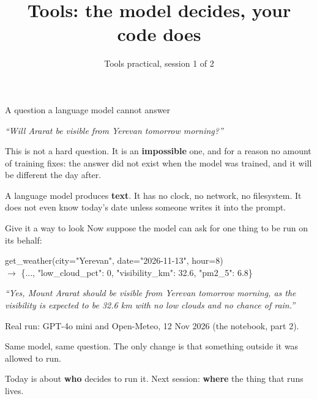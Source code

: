 \documentclass[aspectratio=169]{beamer}
\title{Tools: the model decides, your code does}
\subtitle{Tools practical, session 1 of 2}
\author{}
\date{}
\newcommand{\keybox}[1]{%
  \begin{tcolorbox}[colback=armblue!8, colframe=armblue, boxrule=0.6pt, arc=2pt]
  #1
  \end{tcolorbox}}
\newcommand{\codebox}[1]{%
  \begin{center}
  \begin{tcolorbox}[colback=lightbg, colframe=gray, boxrule=0.5pt, arc=2pt,
                    width=0.94\textwidth, left=4pt, right=4pt, top=3pt, bottom=3pt]
    \ttfamily\scriptsize #1
  \end{tcolorbox}
  \end{center}}
\begin{document}
\begin{frame}[plain]
  \titlepage
\end{frame}

\begin{frame}{A question a language model cannot answer}
  \vspace{0.8em}
  \begin{center}
  \begin{tcolorbox}[colback=lightbg, colframe=gray, boxrule=0.5pt, arc=2pt, width=0.8\textwidth]
    \centering\textit{``Will Ararat be visible from Yerevan tomorrow morning?''}
  \end{tcolorbox}
  \end{center}

  \vspace{0.8em}
  This is not a hard question. It is an \textbf{impossible} one, and for a reason no amount of
  training fixes: the answer did not exist when the model was trained, and it will be different
  the day after.

  \vspace{1.0em}
  \keybox{A language model produces \textbf{text}. It has no clock, no network, no filesystem. It
  does not even know today's date unless someone writes it into the prompt.}
\end{frame}

\begin{frame}{Give it a way to look}
  \vspace{0.6em}
  Now suppose the model can ask for one thing to be run on its behalf:

  \codebox{get\_weather(city="Yerevan", date="2026-11-13", hour=8)\\[0.4em]
  $\rightarrow$ \{..., "low\_cloud\_pct": 0, "visibility\_km": 32.6, "pm2\_5": 6.8\}}

  \vspace{0.4em}
  \begin{center}
  \begin{tcolorbox}[colback=paramgreen!8, colframe=paramgreen, boxrule=0.6pt, arc=2pt,
                    width=0.86\textwidth]
    \centering\small\textit{``Yes, Mount Ararat should be visible from Yerevan tomorrow morning, as the
    visibility is expected to be 32.6 km with no low clouds and no chance of rain.''}
  \end{tcolorbox}
  \end{center}
  {\scriptsize\color{gray}Real run: GPT-4o mini and Open-Meteo, 12 Nov 2026 (the notebook, part 2).}

  \vspace{0.6em}
  Same model, same question. The only change is that something outside it was allowed to run.

  \vspace{0.5em}
  \begin{center}
  {\small\color{gray}Today is about \textbf{who} decides to run it. Next session: \textbf{where} the
  thing that runs lives.}
  \end{center}
\end{frame}
\end{document}
